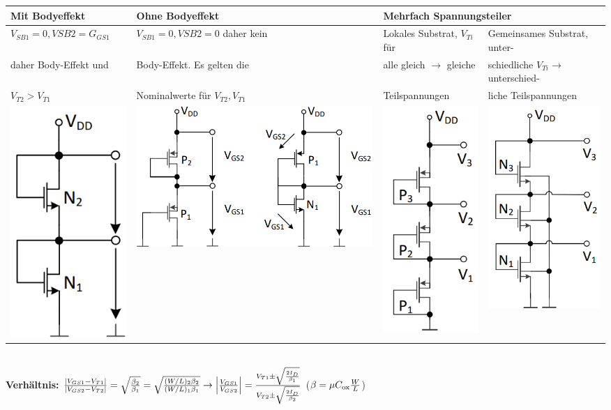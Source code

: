 \begin{tabular}{|l|l|l|l|}
    \hline
    \textbf{Mit Bodyeffekt}     & \textbf{Ohne Bodyeffekt}      & \multicolumn{2}{l|}{\textbf{Mehrfach Spannungsteiler}} \\
    \hline
    $V_{SB1} = 0, V{SB2} = G_{GS1}$ & $V_{SB1} = 0, V{SB2} = 0$ daher kein  & Lokales Substrat, $V_{Ti}$ für        & Gemeinsames Substrat, unter- \\
    daher Body-Effekt und           & Body-Effekt. Es gelten die            & alle gleich $\rightarrow$ gleiche     & schiedliche $V_{Ti} \rightarrow$ unterschied- \\
    $V_{T2}>V_{T1}$                 & Nominalwerte für $V_{T2},V_{T1}$      & Teilspannungen                        & liche Teilspannungen \\
    \includegraphics[width=0.08\linewidth]{Spannungsteiler_mit Body_Effekt.png}    & \includegraphics[width=0.22\linewidth]{Spannungsteiler_ohne Body_Effekt.png}  & \includegraphics[angle=90,width=0.2\linewidth]{Mehrfach_Spannungsteiler_getrennte Substrate.png}   & \includegraphics[angle=90, width=0.2\linewidth]{Mehrfach_Spannungsteiler_gemeinsame Substrate.png}\\
    \hline
\end{tabular}\vspace{5pt}\\
\textbf{Verhältnis:} $\frac{|V_{GS1}-V_{T1}|}{|V_{GS2}-V_{T2}|}= \sqrt{\frac{\beta_2}{\beta_1}}=\sqrt{\frac{(W/L)_2\beta_2}{(W/L)_1\beta_1}}\rightarrow \Bigl|\frac{V_{GS1}}{V_{GS2}}\Bigr| = \frac{V_{T1}\pm\sqrt{\frac{2I_D}{\beta_1}}}{V_{T2}\pm\sqrt{\frac{2I_D}{\beta_2}}}$ \hspace{20pt}($\beta = \mu C_{\rm ox} \frac{W}{L}$)
